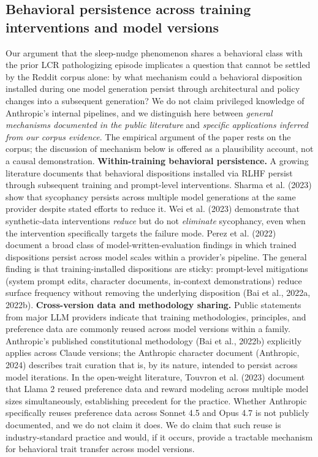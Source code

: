 \documentclass{obelus-preprint}
\begin{document}
\subsection{Behavioral persistence across training interventions and model versions}
Our argument that the sleep-nudge phenomenon shares a behavioral class with the prior LCR pathologizing episode implicates a question that cannot be settled by the Reddit corpus alone: by what mechanism could a behavioral disposition installed during one model generation persist through architectural and policy changes into a subsequent generation? We do not claim privileged knowledge of Anthropic's internal pipelines, and we distinguish here between \emph{general mechanisms documented in the public literature} and \emph{specific applications inferred from our corpus evidence}. The empirical argument of the paper rests on the corpus; the discussion of mechanism below is offered as a plausibility account, not a causal demonstration.
\textbf{Within-training behavioral persistence.} A growing literature documents that behavioral dispositions installed via RLHF persist through subsequent training and prompt-level interventions. Sharma et al. (2023) show that sycophancy persists across multiple model generations at the same provider despite stated efforts to reduce it. Wei et al. (2023) demonstrate that synthetic-data interventions \emph{reduce} but do not \emph{eliminate} sycophancy, even when the intervention specifically targets the failure mode. Perez et al. (2022) document a broad class of model-written-evaluation findings in which trained dispositions persist across model scales within a provider's pipeline. The general finding is that training-installed dispositions are sticky: prompt-level mitigations (system prompt edits, character documents, in-context demonstrations) reduce surface frequency without removing the underlying disposition (Bai et al., 2022a, 2022b).
\textbf{Cross-version data and methodology sharing.} Public statements from major LLM providers indicate that training methodologies, principles, and preference data are commonly reused across model versions within a family. Anthropic's published constitutional methodology (Bai et al., 2022b) explicitly applies across Claude versions; the Anthropic character document (Anthropic, 2024) describes trait curation that is, by its nature, intended to persist across model iterations. In the open-weight literature, Touvron et al. (2023) document that Llama 2 reused preference data and reward modeling across multiple model sizes simultaneously, establishing precedent for the practice. Whether Anthropic specifically reuses preference data across Sonnet 4.5 and Opus 4.7 is not publicly documented, and we do not claim it does. We do claim that such reuse is industry-standard practice and would, if it occurs, provide a tractable mechanism for behavioral trait transfer across model versions.
\end{document}
